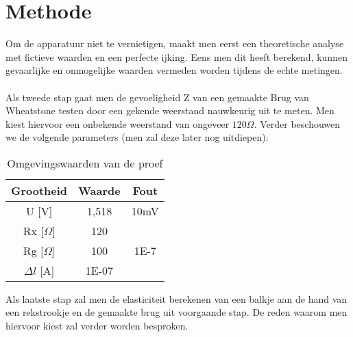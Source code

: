 \section{Methode}

Om de apparatuur niet te vernietigen, maakt men
eerst een theoretische analyse met fictieve waarden en een 
perfecte ijking. Eens men dit heeft berekend, kunnen
gevaarlijke en onmogelijke waarden vermeden worden tijdens de echte metingen.
\\ \\
Als tweede stap gaat men de gevoeligheid Z van een gemaakte Brug
van Wheatstone testen door een gekende weerstand nauwkeurig uit
te meten. Men kiest hiervoor een onbekende weerstand van
ongeveer $120 \Omega$. Verder beschouwen we de volgende parameters
(men zal deze later nog uitdiepen):

\begin{table}[H]
    \caption{Omgevingswaarden van de proef}
    \label{tab:omgevingswaarden}
    \centering
    \begin{tabular}{| c | c | c |}
        \hline
        Grootheid       & Waarde    & Fout \\ \hline
        U [V]           & 1,518     & 10mV \\ \hline
        Rx [$\Omega$]   & 120       &      \\ \hline
        Rg [$\Omega$]   & 100       & 1E-7 \\ \hline
        $\Delta l$ [A]  & 1E-07     &      \\ \hline
    \end{tabular}
\end{table}

Als laatste stap zal men de elasticiteit berekenen van
een balkje aan de hand van een rekstrookje en de gemaakte brug
uit voorgaande stap. De reden waarom men hiervoor kiest zal
verder worden besproken.

